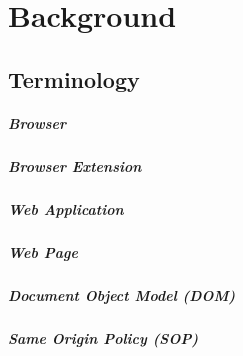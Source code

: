 
\chapter{Background}

\section{Terminology}

\paragraph{Browser}

\paragraph{Browser Extension}

\paragraph{Web Application}

\paragraph{Web Page}

\paragraph{Document Object Model (DOM)}

\paragraph{Same Origin Policy (SOP)}

